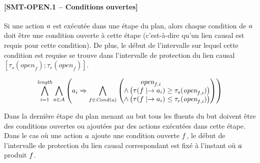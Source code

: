 

\paragraph*{[SMT-OPEN.1 -- Conditions ouvertes]} Si une action $a$ est exécutée dans une étape du plan, alors chaque condition de $a$ doit être une condition ouverte à cette étape (c'est-à-dire qu'un lien causal est requis pour cette condition). De plus, le début de l'intervalle sur lequel cette condition est requise se trouve dans l'intervalle de protection du lien causal $[\tau_{s}(\textit{open}_{f});\tau_{e}(\textit{open}_{f})]$.

\begin{small}
\[
\BigforallTwo{i=1}{\length}\bigwedge\limits_{\substack{\a\in \A}}%
\left(\a_{i} \Rightarrow \Bigforall{\substack{\f\in \cond{\a}}}\begin{pmatrix}\open{\f}{i}\hfill\\ \wedge \left(\tau(\f\mid\rightarrow\a_{i}) \geq \tau_{s}(\open{\f}{i})\right)\hfill\\
 \wedge \left(\tau(\f\mid\rightarrow\a_{i}) \leq \tau_{e}(\open{\f}{i})\right)\end{pmatrix}\right)%
\]
\end{small}

Dans la dernière étape du plan menant au but tous les fluents du but doivent être des conditions ouvertes ou ajoutées par des actions exécutées dans cette étape. Dans le cas où une action $a$ ajoute une condition ouverte $f$, le début de l'intervalle de protection du lien causal correspondant est fixé à l'instant où $a$ produit $f$.

